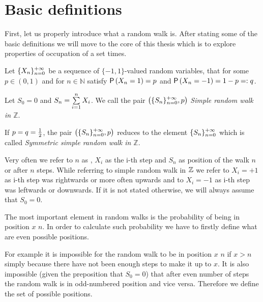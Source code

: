 \chapter{Basic definitions}

\begin{rem}
  First, let us properly introduce what a random walk is. After stating some of the basic definitions we will move to the core of this thesis which is to explore properties of occupation of a set times.
\end{rem}

\begin{defn}\label{defn-simple_random_walk_Z}
 Let $\{X_n\}_{n=0}^{+\infty}$ be a sequence of  \iid $\{-1,1\}$-valued random variables, that for some $p\in(0,1)$ and for $n\in \mathbb{N}$ satisfy $\operatorname{\mathsf{P}} \left( X_n=1 \right) =p$ and $\operatorname{\mathsf{P}} \left( X_n=-1 \right) =1-p=:q$.

 Let $S_0=0$ and $S_n=\suma[i][1][n]X_i$. We call the pair $ \left( \{S_n\}_{n=0}^{+\infty}, p \right) $ \emph{Simple random walk in $\mathbb{Z}$}.

 If $p=q=\frac{1}{2} $, the pair $\left( \{S_n\}_{n=0}^{+\infty}, p \right)$ reduces to the element $\{S_n\}_{n=0}^{+\infty}$ which is called
\emph{Symmetric simple random walk in $\mathbb{Z}$}.
\end{defn}

\begin{rem}
 Very often we refer to $n$ as \Time, $X_i$ as the i-th step and $S_n$ as position of the walk \intime $n$ or after $n$ steps.
 While referring to simple random walk in $\mathbb{Z}$ we refer to $X_i=+1$ as i-th step was rightwards or more often upwards and to $X_i=-1$ as i-th step was leftwards or downwards. If it is not stated otherwise, we will always assume that $S_0=0.$
\end{rem}

\begin{rem}
  The most important element in random walks is the probability of being in position $x$ \intime $n$.
  In order to calculate such probability we have to firstly define what are even possible positions.

  For example it is impossible for the random walk to be in position $x$ \intime $n$ if $x>n$ simply because there have not been enough steps to make it up to $x$. It is also impossible (given the preposition that $S_0=0$) that after even number of steps the random walk is in odd-numbered position and vice versa. Therefore we define the set of possible positions.
\end{rem}

